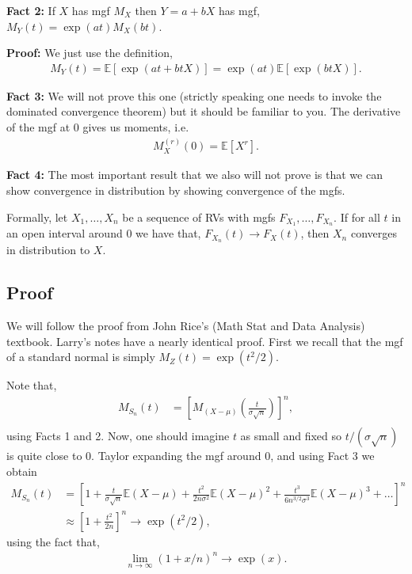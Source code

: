 \documentclass[twoside,12pt]{article}
\begin{document}
{\bf Fact 2: } If $X$ has mgf $M_X$ then $Y = a + bX$ has mgf, $M_Y(t) = \exp(at) M_X(bt)$.

{\bf Proof: } We just use the definition,
\begin{align*}
M_Y(t) = \mathbb{E}[\exp(at + btX)] = \exp(at) \mathbb{E}[\exp(btX)].
\end{align*}

{\bf Fact 3: } We will not prove this one (strictly speaking one needs to invoke the dominated convergence theorem) but it should be familiar to you. The derivative of the mgf at 0 gives us moments, i.e.
\begin{align*}
M^{(r)}_X(0) = \mathbb{E}[X^r].
\end{align*}

{\bf Fact 4: } The most important result that we also will not prove is that we can show convergence in distribution by showing convergence of the mgfs. 

Formally, let $X_1,\ldots,X_n$ be a sequence of RVs with mgfs $F_{X_1},\ldots,F_{X_n}$. If for all $t$ in an open interval around 0 we have that, $F_{X_n}(t) \rightarrow F_X(t)$, then $X_n$ converges in distribution to $X$.



\subsection{Proof}
We will follow the proof from John Rice's (Math Stat and Data Analysis) textbook. Larry's notes have a nearly identical proof. First we recall that the mgf of a standard normal is simply $M_Z(t) = \exp(t^2/2)$.

Note that,
\begin{align*}
M_{S_n}(t) &= \left[M_{(X-\mu)}\left( \frac{t}{\sigma \sqrt{n}} \right) \right]^n, \\
\end{align*}
using Facts 1 and 2. Now, one should imagine $t$ as small and fixed so $t/(\sigma \sqrt{n})$ is quite close to 0. Taylor expanding the mgf around 0, and using Fact 3 we obtain 
\begin{align*}
M_{S_n}(t) &= \left[ 1 + \frac{t}{\sigma \sqrt{n}} \mathbb{E}(X - \mu) + 
\frac{t^2}{2 n \sigma^2} \mathbb{E}(X - \mu)^2 + \frac{t^3}{6 n^{3/2} \sigma^3} \mathbb{E}(X - \mu)^3 + \ldots \right]^n \\
&\approx  \left[ 1 + 
\frac{t^2}{2 n} \right]^n \rightarrow \exp(t^2/2),
\end{align*}
using the fact that,
\begin{align*}
\lim_{n \rightarrow \infty} (1 + x/n)^n \rightarrow \exp(x).
\end{align*}
\end{document}
